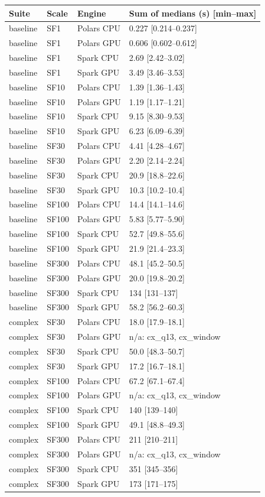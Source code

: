 \begin{tabular}{llll}
\toprule
Suite & Scale & Engine & Sum of medians (s) [min--max] \\
\midrule
baseline & SF1 & Polars CPU & 0.227 [0.214--0.237] \\
baseline & SF1 & Polars GPU & 0.606 [0.602--0.612] \\
baseline & SF1 & Spark CPU & 2.69 [2.42--3.02] \\
baseline & SF1 & Spark GPU & 3.49 [3.46--3.53] \\
baseline & SF10 & Polars CPU & 1.39 [1.36--1.43] \\
baseline & SF10 & Polars GPU & 1.19 [1.17--1.21] \\
baseline & SF10 & Spark CPU & 9.15 [8.30--9.53] \\
baseline & SF10 & Spark GPU & 6.23 [6.09--6.39] \\
baseline & SF30 & Polars CPU & 4.41 [4.28--4.67] \\
baseline & SF30 & Polars GPU & 2.20 [2.14--2.24] \\
baseline & SF30 & Spark CPU & 20.9 [18.8--22.6] \\
baseline & SF30 & Spark GPU & 10.3 [10.2--10.4] \\
baseline & SF100 & Polars CPU & 14.4 [14.1--14.6] \\
baseline & SF100 & Polars GPU & 5.83 [5.77--5.90] \\
baseline & SF100 & Spark CPU & 52.7 [49.8--55.6] \\
baseline & SF100 & Spark GPU & 21.9 [21.4--23.3] \\
baseline & SF300 & Polars CPU & 48.1 [45.2--50.5] \\
baseline & SF300 & Polars GPU & 20.0 [19.8--20.2] \\
baseline & SF300 & Spark CPU & 134 [131--137] \\
baseline & SF300 & Spark GPU & 58.2 [56.2--60.3] \\
complex & SF30 & Polars CPU & 18.0 [17.9--18.1] \\
complex & SF30 & Polars GPU & n/a: cx\_q13, cx\_window \\
complex & SF30 & Spark CPU & 50.0 [48.3--50.7] \\
complex & SF30 & Spark GPU & 17.2 [16.7--18.1] \\
complex & SF100 & Polars CPU & 67.2 [67.1--67.4] \\
complex & SF100 & Polars GPU & n/a: cx\_q13, cx\_window \\
complex & SF100 & Spark CPU & 140 [139--140] \\
complex & SF100 & Spark GPU & 49.1 [48.8--49.3] \\
complex & SF300 & Polars CPU & 211 [210--211] \\
complex & SF300 & Polars GPU & n/a: cx\_q13, cx\_window \\
complex & SF300 & Spark CPU & 351 [345--356] \\
complex & SF300 & Spark GPU & 173 [171--175] \\
\bottomrule
\end{tabular}
